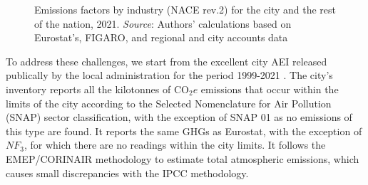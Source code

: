\documentclass[
  10pt,
  twocolumn]{aft}
\begin{document}
\begin{figure}


\caption{\label{fig-intensity-ratio}Emissions factors by industry (NACE
rev.2) for the city and the rest of the nation, 2021. \emph{Source}:
Authors' calculations based on Eurostat's, FIGARO, and regional and city
accounts data}

\end{figure}%

To address these challenges, we start from the excellent city AEI
released publically by the local administration for the period 1999-2021
\citep{am_inventario_2021}. The city's inventory reports all the
kilotonnes of \(\text{CO}_2e\) emissions that occur within the limits of
the city according to the Selected Nomenclature for Air Pollution (SNAP)
sector classification, with the exception of SNAP 01 as no emissions of
this type are found. It reports the same GHGs as Eurostat, with the
exception of \(NF_3\), for which there are no readings within the city
limits. It follows the EMEP/CORINAIR methodology to estimate total
atmospheric emissions, which causes small discrepancies with the IPCC
methodology.
\end{document}

